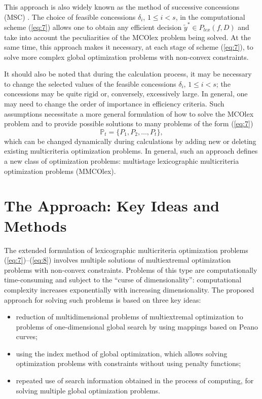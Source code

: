 \documentclass[smallextended]{svjour3}       %
\begin{document}
This approach is also widely known as the method of successive concessions (MSC) \cite{c3,c4,c5}. The choice of feasible concessions $\delta_i$, $1 \leq i < s$, in the computational scheme (\ref{eq:7}) allows one to obtain any efficient decision $\widetilde{y}^* \in P_{lex}(f,D)$ and take into account the peculiarities of the MCOlex problem being solved. At the same time, this approach makes it necessary, at each stage of scheme (\ref{eq:7}), to solve more complex global optimization problems with non-convex constraints.

It should also be noted that during the calculation process, it may be necessary to change the selected values of the feasible concessions $\delta_i$, $1 \leq i < s$; the concessions may be quite rigid or, conversely, excessively large. In general, one may need to change the order of importance in efficiency criteria. Such assumptions necessitate a more general formulation of how to solve the MCOlex problem and to provide possible solutions to many problems of the form (\ref{eq:7})
\begin{equation}\label{eq:8}
\mathbb{P}_t=\{ P_1,P_2,\dots,P_t\},
\end{equation}
which can be changed dynamically during calculations by adding new or deleting existing multicriteria optimization problems. In general, such an approach defines a new class of optimization problems: multistage lexicographic multicriteria optimization problems (MMCOlex).

\section{The Approach: Key Ideas and Methods}
\label{sec:3}

The extended formulation of lexicographic multicriteria optimization problems (\ref{eq:7})--(\ref{eq:8}) involves multiple solutions of multiextremal optimization problems with non-convex constraints. Problems of this type are computationally time-consuming and subject to the ``curse of dimensionality'': computational complexity increases exponentially with increasing dimensionality. The proposed approach for solving such problems is based on three key ideas:
\begin{itemize}
  \item reduction of multidimensional problems of multiextremal optimization to problems of one-dimensional global search by using mappings based on Peano curves;
  \item using the index method of global optimization, which allows solving optimization problems with constraints without using penalty functions;
  \item repeated use of search information obtained in the process of computing, for solving multiple global optimization problems.
\end{itemize}
\end{document}
